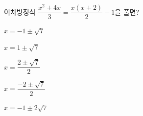 이차방정식 $\dfrac{x^2+4x}{3}=\dfrac{x(x+2)}{2}-1$을 풀면?
\begin{choicesii}{\rule[-3ex]{0pt}{8ex}$x=-1\pm\sqrt{7}$}{\rule[-3ex]{0pt}{8ex}$x=1\pm\sqrt{7}$}{\rule[-3ex]{0pt}{8ex}$x=\dfrac{2\pm\sqrt{7}}{2}$}{\rule[-3ex]{0pt}{8ex}$x=\dfrac{-2\pm\sqrt{7}}{2}$}{\rule[-3ex]{0pt}{8ex}$x=-1\pm2\sqrt{7}$}\end{choicesii}
